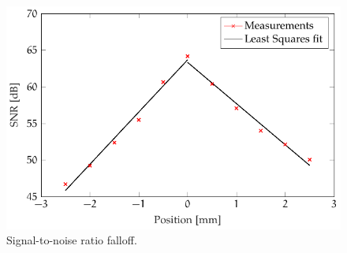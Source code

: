 \begin{figure}[hbt]
\myfloatalign
\includegraphics[width=0.9\linewidth]{gfx/falloff-fit}
\caption{Signal-to-noise ratio falloff.}\label{fig:falloff-fit}
\end{figure}



